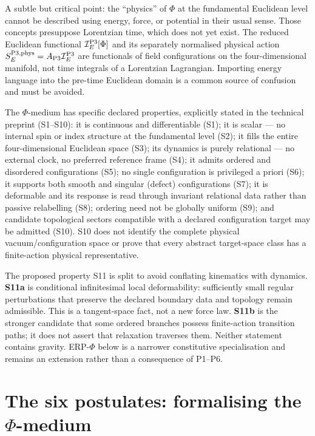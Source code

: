\documentclass[11pt,a4paper]{article}
\begin{document}
A subtle but critical point: the ``physics'' of $\Phi$ at the fundamental Euclidean level cannot be described using energy, force, or potential in their usual sense. Those concepts presuppose Lorentzian time, which does not yet exist. The reduced Euclidean functional
$\mathcal I_E^{\rm P3}[\Phi]$ and its separately normalised physical action
$S_E^{{\rm P3},{\rm phys}}=A_{\rm P3}\mathcal I_E^{\rm P3}$ are
functionals of field configurations on the four-dimensional manifold, not
time integrals of a Lorentzian Lagrangian. Importing energy language into the pre-time Euclidean domain is a common source of confusion and must be avoided.

The $\Phi$-medium has specific declared properties, explicitly stated in the technical preprint (S1--S10): it is continuous and differentiable (S1); it is scalar --- no internal spin or index structure at the fundamental level (S2); it fills the entire four-dimensional Euclidean space (S3); its dynamics is purely relational --- no external clock, no preferred reference frame (S4); it admits ordered and disordered configurations (S5); no single configuration is privileged a priori (S6); it supports both smooth and singular (defect) configurations (S7); it is deformable and its response is read through invariant relational data rather than passive relabelling (S8); ordering need not be globally uniform (S9); and candidate topological sectors compatible with a declared configuration target may be admitted (S10).  S10 does not identify the complete physical vacuum/configuration space or prove that every abstract target-space class has a finite-action physical representative.


The proposed property S11 is split to avoid conflating kinematics with dynamics.  \textbf{S11a} is conditional infinitesimal local deformability: sufficiently small regular perturbations that preserve the declared boundary data and topology remain admissible.  This is a tangent-space fact, not a new force law.  \textbf{S11b} is the stronger candidate that some ordered branches possess finite-action transition paths; it does not assert that relaxation traverses them.  Neither statement contains gravity.  ERP-$\Phi$ below is a narrower constitutive specialisation and remains an extension rather than a consequence of P1--P6.


\section{The six postulates: formalising the $\Phi$-medium}
\label{sec:pop_postulates}
\end{document}

